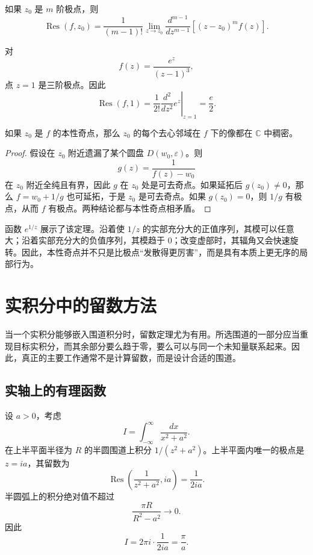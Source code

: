 \begin{proposition}[$m$ 阶极点处的留数]
如果 $z_0$ 是 $m$ 阶极点，则
\[
    \operatorname{Res}(f,z_0)
    =\frac{1}{(m-1)!}
    \lim_{z\to z_0}
    \frac{d^{m-1}}{dz^{m-1}}
    \left[(z-z_0)^m f(z)\right].
\]
\end{proposition}

\begin{example}
对
\[
    f(z)=\frac{e^z}{(z-1)^3},
\]
点 $z=1$ 是三阶极点。因此
\[
    \operatorname{Res}(f,1)
    =\frac{1}{2!}\left.\frac{d^2}{dz^2}e^z\right|_{z=1}
    =\frac{e}{2}.
\]
\end{example}

\begin{theorem}
如果 $z_0$ 是 $f$ 的本性奇点，那么 $z_0$ 的每个去心邻域在 $f$ 下的像都在 $\mathbb{C}$ 中稠密。
\end{theorem}

\begin{proof}
假设在 $z_0$ 附近遗漏了某个圆盘 $D(w_0,\varepsilon)$。则
\[
    g(z)=\frac{1}{f(z)-w_0}
\]
在 $z_0$ 附近全纯且有界，因此 $g$ 在 $z_0$ 处是可去奇点。如果延拓后 $g(z_0)\neq0$，那么 $f=w_0+1/g$ 也可延拓，于是 $z_0$ 是可去奇点。如果 $g(z_0)=0$，则 $1/g$ 有极点，从而 $f$ 有极点。两种结论都与本性奇点相矛盾。
\end{proof}

\begin{remark}
函数 $e^{1/z}$ 展示了该定理。沿着使 $1/z$ 的实部充分大的正值序列，其模可以任意大；沿着实部充分大的负值序列，其模趋于 $0$；改变虚部时，其辐角又会快速旋转。因此，本性奇点并不只是比极点“发散得更厉害”，而是具有本质上更无序的局部行为。
\end{remark}

\section{实积分中的留数方法}

当一个实积分能够嵌入围道积分时，留数定理尤为有用。所选围道的一部分应当重现目标实积分，而其余部分要么趋于零，要么可以与同一个未知量联系起来。因此，真正的主要工作通常不是计算留数，而是设计合适的围道。

\subsection{实轴上的有理函数}

\begin{example}[基本 Cauchy 积分]
设 $a>0$，考虑
\[
    I=\int_{-\infty}^{\infty}\frac{dx}{x^2+a^2}.
\]
在上半平面半径为 $R$ 的半圆围道上积分 $1/(z^2+a^2)$。上半平面内唯一的极点是 $z=ia$，其留数为
\[
    \operatorname{Res}\left(\frac{1}{z^2+a^2},ia\right)
    =\frac{1}{2ia}.
\]
半圆弧上的积分绝对值不超过
\[
    \frac{\pi R}{R^2-a^2}\longrightarrow0.
\]
因此
\[
    I=2\pi i\cdot\frac{1}{2ia}=\frac{\pi}{a}.
\]
\end{example}

